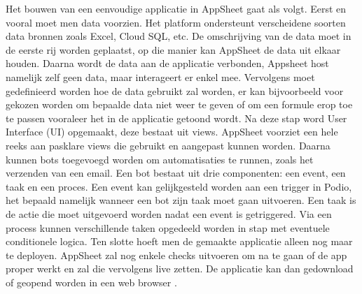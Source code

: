 Het bouwen van een eenvoudige applicatie in AppSheet gaat als volgt. Eerst en vooral moet men data voorzien. Het platform ondersteunt verscheidene soorten data bronnen zoals Excel, Cloud SQL, etc. De omschrijving van de data moet in de eerste rij worden geplaatst, op die manier kan AppSheet de data uit elkaar houden. Daarna wordt de data aan de applicatie verbonden, Appsheet host namelijk zelf geen data, maar interageert er enkel mee. Vervolgens moet gedefinieerd worden hoe de data gebruikt zal worden, er kan bijvoorbeeld voor gekozen worden om bepaalde data niet weer te geven of om een formule erop toe te passen vooraleer het in de applicatie getoond wordt. Na deze stap word User Interface (UI) opgemaakt, deze bestaat uit views. AppSheet voorziet een hele reeks aan pasklare views die gebruikt en aangepast kunnen worden.  Daarna kunnen bots toegevoegd worden om automatisaties te runnen, zoals het verzenden van een email. Een bot bestaat uit drie componenten: een event, een taak en een proces. Een event kan gelijkgesteld worden aan een trigger in Podio, het bepaald namelijk wanneer een bot zijn taak moet gaan uitvoeren. Een taak is de actie die moet uitgevoerd worden nadat een event is getriggered. Via een process kunnen verschillende taken opgedeeld worden in stap met eventuele conditionele logica. Ten slotte hoeft men de gemaakte applicatie alleen nog maar te deployen. AppSheet zal nog enkele checks uitvoeren om na te gaan of de app proper werkt en zal die vervolgens live zetten. De applicatie kan dan gedownload of geopend worden in een web browser \autocite{AppSheetHowToCreate}. \\
